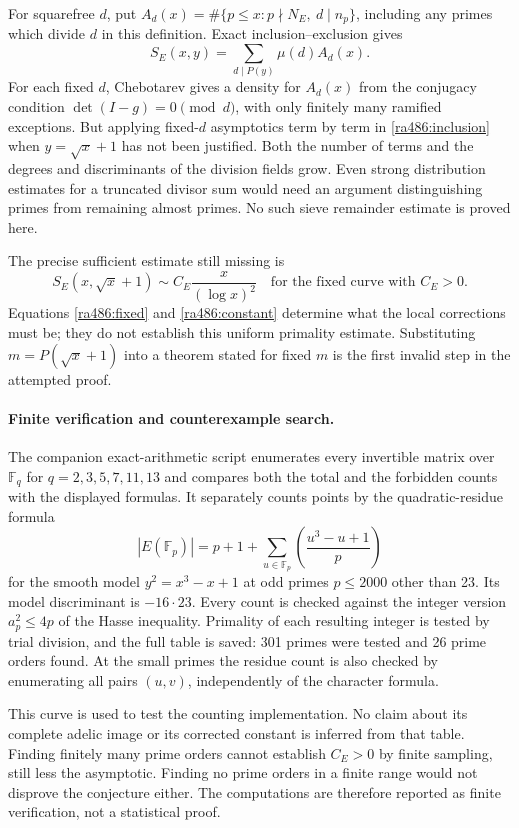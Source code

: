 \documentclass[11pt]{article}
\begin{document}
For squarefree $d$, put
$A_d(x)=\#\{p\le x:p\nmid N_E,\ d\mid n_p\}$, including any primes
which divide $d$ in this definition. Exact inclusion--exclusion gives
\begin{equation}\label{ra486:inclusion}
 S_E(x,y)=\sum_{d\mid P(y)}\mu(d)A_d(x).
\end{equation}
For each fixed $d$, Chebotarev gives a density for $A_d(x)$ from the
conjugacy condition $\det(I-g)=0\pmod d$, with only finitely many
ramified exceptions. But applying fixed-$d$ asymptotics term by term in
\eqref{ra486:inclusion} when $y=\sqrt x+1$ has not been justified.
Both the number of terms and the degrees and discriminants of the
division fields grow. Even strong distribution estimates for a truncated
divisor sum would need an argument distinguishing primes from remaining
almost primes. No such sieve remainder estimate is proved here.

The precise sufficient estimate still missing is
\[
 S_E(x,\sqrt x+1)\sim C_E\frac{x}{(\log x)^2}
 \quad\text{for the fixed curve with }C_E>0.
\]
Equations \eqref{ra486:fixed} and \eqref{ra486:constant} determine what the
local corrections must be; they do not establish this uniform primality
estimate. Substituting $m=P(\sqrt x+1)$ into a theorem stated for fixed
$m$ is the first invalid step in the attempted proof.

\paragraph{Finite verification and counterexample search.}
The companion exact-arithmetic script enumerates every invertible matrix
over $\mathbb F_q$ for $q=2,3,5,7,11,13$ and compares both the total and
the forbidden counts with the displayed formulas. It separately counts
points by the quadratic-residue formula
\[
 |E(\mathbb F_p)|=p+1+\sum_{u\in\mathbb F_p}
              \left(\frac{u^3-u+1}{p}\right)
\]
for the smooth model $y^2=x^3-x+1$ at odd primes $p\le2000$ other
than 23. Its model discriminant is $-16\cdot23$. Every count is checked
against the integer version $a_p^2\le4p$ of the Hasse inequality.
Primality of each resulting integer is tested by trial division, and the
full table is saved: 301 primes were tested and 26 prime orders found.
At the small primes the residue count is also checked
by enumerating all pairs $(u,v)$, independently of the character formula.

This curve is used to test the counting implementation. No claim about
its complete adelic image or its corrected constant is inferred from that
table. Finding finitely many prime orders cannot establish $C_E>0$ by
finite sampling, still less the asymptotic. Finding no prime orders in a
finite range would not disprove the conjecture either. The computations
are therefore reported as finite verification, not a statistical proof.
\end{document}
